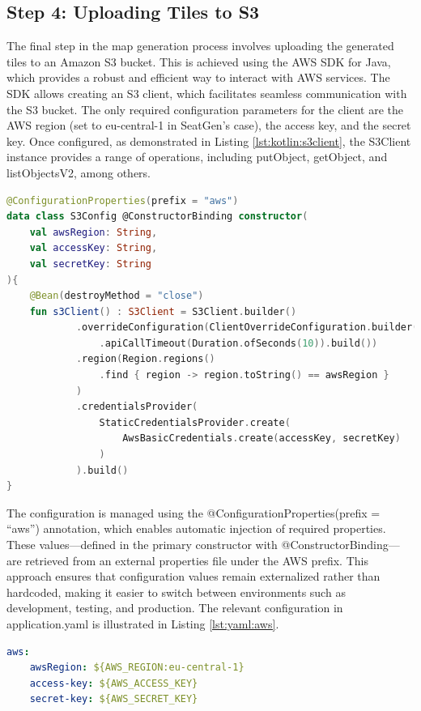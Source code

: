 \subsection{Step 4: Uploading Tiles to S3}

The final step in the map generation process involves uploading the generated tiles to an Amazon S3 bucket. This is achieved using the AWS SDK for Java, which provides a robust and efficient way to interact with AWS services. The SDK allows creating an S3 client, which facilitates seamless communication with the S3 bucket. The only required configuration parameters for the client are the AWS region (set to eu-central-1 in SeatGen's case), the access key, and the secret key. Once configured, as demonstrated in Listing \ref{lst:kotlin:s3client}, the S3Client instance provides a range of operations, including putObject, getObject, and listObjectsV2, among others.

\begin{lstlisting}[language=Kotlin,caption=Configuring the S3 Client,label=lst:kotlin:s3client]
@ConfigurationProperties(prefix = "aws")
data class S3Config @ConstructorBinding constructor(
    val awsRegion: String,
    val accessKey: String,
    val secretKey: String
){
    @Bean(destroyMethod = "close")
    fun s3Client() : S3Client = S3Client.builder()
            .overrideConfiguration(ClientOverrideConfiguration.builder()
                .apiCallTimeout(Duration.ofSeconds(10)).build())
            .region(Region.regions()
                .find { region -> region.toString() == awsRegion }
            )
            .credentialsProvider(
                StaticCredentialsProvider.create(
                    AwsBasicCredentials.create(accessKey, secretKey)
                )
            ).build()
}
\end{lstlisting}

The configuration is managed using the @ConfigurationProperties(prefix = ``aws'') annotation, which enables automatic injection of required properties. These values—defined in the primary constructor with @ConstructorBinding—are retrieved from an external properties file under the AWS prefix. This approach ensures that configuration values remain externalized rather than hardcoded, making it easier to switch between environments such as development, testing, and production. The relevant configuration in application.yaml is illustrated in Listing \ref{lst:yaml:aws}.
\begin{lstlisting}[language=Yaml, caption=AWS Configuration in the application.yaml, label=lst:yaml:aws]
aws:
    awsRegion: ${AWS_REGION:eu-central-1}
    access-key: ${AWS_ACCESS_KEY}
    secret-key: ${AWS_SECRET_KEY}
\end{lstlisting}

